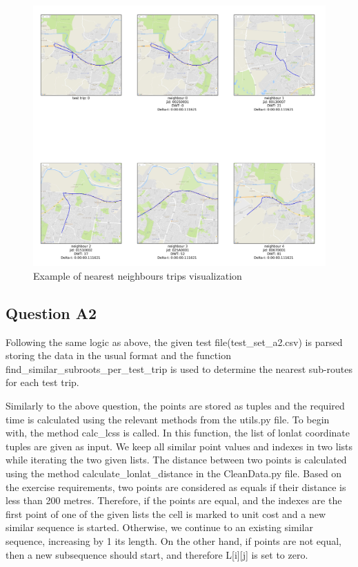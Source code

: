 \documentclass[12pt]{article}
\begin{document}
	\begin{figure} [H]
		\begin{center}
			\includegraphics [scale = 0.50] {question2a1example.jpg}
			\caption{Example of nearest neighbours trips visualization}
		\end{center}
	\end{figure} 
	
	\subsection{Question A2}
	Following the same logic as above, the given test file(test\_set\_a2.csv) is parsed storing the data in the usual format and the function find\_similar\_subroots\_per\_test\_trip is used to determine the nearest sub-routes for each test trip.
	
	Similarly to the above question, the points are stored as tuples and the required time is calculated using the relevant methods from the utils.py file. To begin with, the method calc\_lcss is called. In this function, the list of lonlat coordinate tuples are given as input. We keep all similar point values and indexes in two lists while iterating the two given lists. The distance between two points is calculated using the method calculate\_lonlat\_distance in the CleanData.py file. Based on the exercise requirements, two points are considered as equals if their distance is less than 200 metres. Therefore, if the points are equal, and the indexes are the first point of one of the given lists the cell is marked to unit cost and a new similar sequence is started. Otherwise, we continue to an existing similar sequence, increasing by 1 its length.  On the other hand, if points are not equal, then a new subsequence should start, and therefore L[i][j] is set to zero.
	
\end{document}
